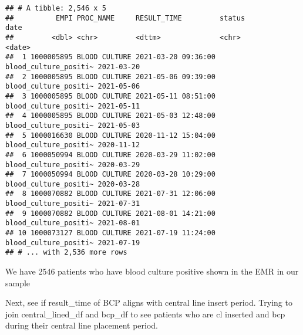 \documentclass[
]{article}
\begin{document}
\begin{verbatim}
## # A tibble: 2,546 x 5
##          EMPI PROC_NAME     RESULT_TIME         status                date      
##         <dbl> <chr>         <dttm>              <chr>                 <date>    
##  1 1000005895 BLOOD CULTURE 2021-03-20 09:36:00 blood_culture_positi~ 2021-03-20
##  2 1000005895 BLOOD CULTURE 2021-05-06 09:39:00 blood_culture_positi~ 2021-05-06
##  3 1000005895 BLOOD CULTURE 2021-05-11 08:51:00 blood_culture_positi~ 2021-05-11
##  4 1000005895 BLOOD CULTURE 2021-05-03 12:48:00 blood_culture_positi~ 2021-05-03
##  5 1000016630 BLOOD CULTURE 2020-11-12 15:04:00 blood_culture_positi~ 2020-11-12
##  6 1000050994 BLOOD CULTURE 2020-03-29 11:02:00 blood_culture_positi~ 2020-03-29
##  7 1000050994 BLOOD CULTURE 2020-03-28 10:29:00 blood_culture_positi~ 2020-03-28
##  8 1000070882 BLOOD CULTURE 2021-07-31 12:06:00 blood_culture_positi~ 2021-07-31
##  9 1000070882 BLOOD CULTURE 2021-08-01 14:21:00 blood_culture_positi~ 2021-08-01
## 10 1000073127 BLOOD CULTURE 2021-07-19 11:24:00 blood_culture_positi~ 2021-07-19
## # ... with 2,536 more rows
\end{verbatim}

We have 2546 patients who have blood culture positive shown in the EMR
in our sample

Next, see if result\_time of BCP aligns with central line insert period.
Trying to join central\_lined\_df and bcp\_df to see patients who are cl
inserted and bcp during their central line placement period.
\end{document}
